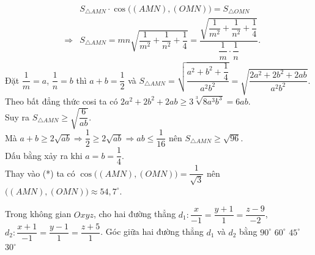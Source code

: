 \begin{bt}
{\begin{eqnarray*}
& &{S_{\triangle AMN}}\cdot \cos\big((AMN),(OMN)\big)=S_{\triangle OMN}\\
&\Rightarrow& S_{\triangle AMN}=mn\sqrt{\dfrac{1}{m^2}+\dfrac{1}{n^2}+\dfrac{1}{4}}=\dfrac{\sqrt{\dfrac{1}{m^2}+\dfrac{1}{n^2}+\dfrac{1}{4}}}{\dfrac{1}{m}\cdot\dfrac{1}{n}}.
\end{eqnarray*}
Đặt $\dfrac{1}{m}=a$, $\dfrac{1}{n}=b$ thì $a+b=\dfrac{1}{2}$ và ${S_{\triangle AMN}}=\sqrt{\dfrac{a^2+b^2+\dfrac{1}{4}}{a^2b^2}}=\sqrt{\dfrac{2a^2+2b^2+2ab}{a^2{b^2}}}$.\\
Theo bất đẳng thức cosi ta có $2a^2+2b^2+2ab\ge 3\sqrt[3]{8a^3{b^3}}=6ab$.\\
Suy ra ${S_{\triangle AMN}}\ge \sqrt{\dfrac{6}{ab}}$.\\
Mà $a+b\ge 2\sqrt{ab}\Rightarrow \dfrac{1}{2}\ge 2\sqrt{ab}\Rightarrow ab\le \dfrac{1}{16}$ nên ${S_{\triangle AMN}}\ge \sqrt{96}$.\\
Dấu bằng xảy ra khi $a=b=\dfrac{1}{4}$.\\ 
Thay vào (*) ta có $\cos\big((AMN),( OMN)\big)=\dfrac{1}{\sqrt{3}}$ nên $\big((AMN),(OMN)\big)\approx 54{,}7^\circ$.
	}
\end{bt}

\begin{ex}%
	Trong không gian $Oxyz$,  cho hai đường thẳng $d_{1}\colon \dfrac{x}{-1}=\dfrac{y+1}{1}=\dfrac{z-9}{-2}$,\break$d_{2}\colon \dfrac{x+1}{-1}=\dfrac{y-1}{1}=\dfrac{z+5}{1}$. Góc giữa hai đường thẳng $d_1$ và $d_2$ bằng
	 \choice
		{\True  $90^{\circ}$}
		 {$60^{\circ}$}
		{$45^{\circ}$} 
		 {$30^{\circ}$}
\end{ex}

